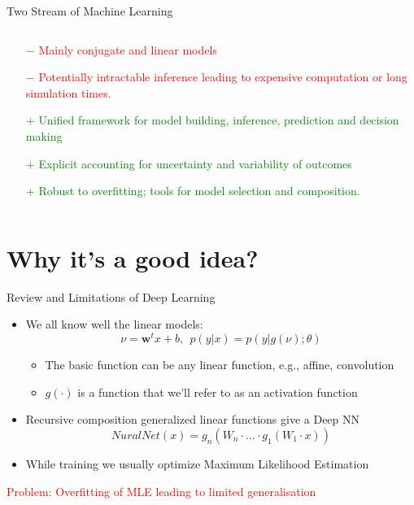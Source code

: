 \documentclass{beamer}
\begin{document}
\begin{frame}{Two Stream of Machine Learning}
\begin{columns}[T]
\begin{column}{.53\textwidth}
			\vspace{-0.3cm}
			\begin{itemize}
				\item[\textcolor{red}{$-$}] \textcolor{red}{ Mainly conjugate and linear models}
				\item[\textcolor{red}{$-$}] \textcolor{red}{Potentially intractable inference leading to expensive computation or long simulation times.}
					
				\item[\textcolor{green}{+}] \textcolor{green}{Unified framework for model building, inference, prediction and decision making}
				\item[\textcolor{green}{+}] \textcolor{green}{Explicit accounting for uncertainty and variability of outcomes}
				\item[\textcolor{green}{+}] \textcolor{green}{ Robust to overfitting; tools for model selection and composition.}
			\end{itemize}
		\end{column}%
	\end{columns}
\end{frame}

\section{Why it's a good idea?}

\begin{frame}{Review and Limitations of Deep Learning}	
	\begin{itemize}
		\item We all know well the linear models:
			$$\nu = \textbf{w}^t x + b, ~~p(y|x) = p(y|g(\nu); \theta)$$
			\begin{itemize}
				\item The basic function can be any linear function, e.g., affine, convolution
				\item $g(\cdot)$ is a function that we’ll refer to as an activation function
			\end{itemize}
		\item Recursive composition generalized linear functions give a Deep NN
			$$NuralNet(x) = g_n(W_n \cdot \dots \cdot g_1(W_1 \cdot x))$$
		\item While training we usually optimize Maximum Likelihood Estimation
	\end{itemize}

 	\begin{tcolorbox}[colback=black!80, colframe=black!80]
 		\begin{center}
 			\text{\textcolor{white}{A general framework for building non-linear, parametric models}}
 		\end{center}
 	\end{tcolorbox}
	
	\begin{center}
		\textcolor{red}{Problem: Overfitting of MLE leading to limited generalisation} 
	\end{center}
\end{frame}
\end{document}
